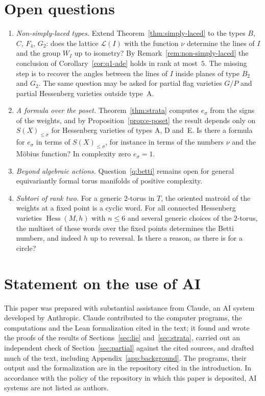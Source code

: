 \documentclass[11pt,a4paper]{article}
\numberwithin{equation}{section}
\theoremstyle{plain}
\theoremstyle{definition}
\theoremstyle{remark}
\newcommand{\cL}{\mathcal{L}}
\DeclareMathOperator{\Hess}{Hess}
\begin{document}
\section{Open questions}\label{sec:open}

\begin{enumerate}[label=(\arabic*)]
\item \emph{Non-simply-laced types.} Extend Theorem~\ref{thm:simply-laced} to the types $B$, $C$, $F_4$, $G_2$: does the lattice $\cL(I)$ with the function $\nu$ determine the lines of $I$ and the group $W_I$ up to isometry? By Remark~\ref{rem:non-simply-laced} the conclusion of Corollary~\ref{cor:q1-ade} holds in rank at most~$5$. The missing step is to recover the angles between the lines of $I$ inside planes of type $B_2$ and $G_2$. The same question may be asked for partial flag varieties $G/P$ and partial Hessenberg varieties outside type~A.
\item \emph{A formula over the poset.} Theorem~\ref{thm:strata} computes $e_\sigma$ from the signs of the weights, and by Proposition~\ref{prop:e-poset} the result depends only on $S(X)_{\leqslant\sigma}$ for Hessenberg varieties of types A, D and~E. Is there a formula for $e_\sigma$ in terms of $S(X)_{\leqslant\sigma}$, for instance in terms of the numbers $\nu$ and the Möbius function? In complexity zero $e_\sigma=1$.
\item \emph{Beyond algebraic actions.} Question~\ref{q:betti} remains open for general equivariantly formal torus manifolds of positive complexity.
\item \emph{Subtori of rank two.} For a generic $2$-torus in $T$, the oriented matroid of the weights at a fixed point is a cyclic word. For all connected Hessenberg varieties $\Hess(M,h)$ with $n\leqslant6$ and several generic choices of the $2$-torus, the multiset of these words over the fixed points determines the Betti numbers, and indeed $h$ up to reversal. Is there a reason, as there is for a circle?
\end{enumerate}

\section*{Statement on the use of AI}
This paper was prepared with substantial assistance from Claude, an AI system developed by Anthropic. Claude contributed to the computer programs, the computations and the Lean formalization cited in the text; it found and wrote the proofs of the results of Sections~\ref{sec:lie} and~\ref{sec:strata}, carried out an independent check of Section~\ref{sec:partial} against the cited sources, and drafted much of the text, including Appendix~\ref{app:background}. The programs, their output and the formalization are in the repository cited in the introduction. In accordance with the policy of the repository in which this paper is deposited, AI systems are not listed as authors.
\end{document}
